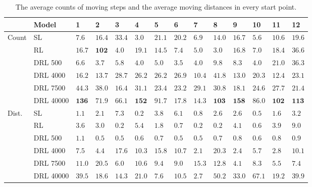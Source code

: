  \begin{table}[!ht]
   \centering
   \caption{The average counts of moving steps and the average moving distances in every start point.}
   \label{tab:table_heatmapscore}
   \begin{tabular}{llp{0.5cm}p{0.5cm}p{0.5cm}p{0.5cm}p{0.5cm}p{0.5cm}p{0.5cm}p{0.5cm}p{0.5cm}p{0.5cm}p{0.5cm}p{0.5cm}}
   \hline
   &Model  & 1 & 2 & 3 & 4 & 5 & 6 & 7 & 8 & 9 & 10 & 11 & 12 \\
   \hline
   \multirow{6}{*}{Count} & SL &$ 7.6 $ &$ 16.4 $ &$ 33.4 $ &$ 3.0 $ &$ 21.1 $ &$ 20.2 $ &$ 6.9 $ &$ 14.0 $ &$ 16.7 $ &$ 5.6 $ &$ 10.6 $ &$ 19.6 $\\
   & RL  &$ 16.7 $ &$ \mathbf{102} $ &$ 4.0 $ &$ 19.1 $ &$ 14.5 $ &$ 7.4 $ &$ 5.0 $ &$ 3.0 $ &$ 16.8 $ &$ 7.0 $ &$ 18.4 $ &$ 36.6 $\\
   & DRL 500 &$ 6.6 $ &$ 3.7 $ &$ 5.8 $ &$ 4.0 $ &$ 5.0 $ &$ 3.5 $ &$ 4.0 $ &$ 9.8 $ &$ 8.3 $ &$ 4.0 $ &$ 21.0 $ &$ 36.3 $\\
   & DRL 4000 &$ 16.2 $ &$ 13.7 $ &$ 28.7 $ &$ 26.2 $ &$ 26.2 $ &$ \mathbf{26.9} $ &$ 10.4 $ &$ 41.8 $ &$ 13.0 $ &$ 20.3 $ &$ 12.4 $ &$ 23.1 $\\
   & DRL 7500 &$ 44.3 $ &$ 38.0 $ &$ 16.4 $ &$ 31.1 $ &$ 23.4 $ &$ 23.2 $ &$ \mathbf{29.1} $ &$ 30.8 $ &$ 18.1 $ &$ 24.6 $ &$ 27.7 $ &$ 21.4 $ \\
   & DRL 40000 &$ \mathbf{136} $ &$ 71.9 $ & $ \mathbf{66.1} $ & $ \mathbf{152} $ &$ \mathbf{91.7} $ &$ 17.8 $ &  $14.3 $ &$ \mathbf{103} $ &$ \mathbf{158} $ &$ \mathbf{86.0} $ &$ \mathbf{102} $ &$ \mathbf{113} $\\
   \hline
   \multirow{6}{*}{Dist.} & SL &$ 1.1 $ &$ 2.1 $ &$ 7.3 $ &$ 0.2 $ &$ 3.8 $ &$ 6.1 $ &$ 0.8 $ &$ 2.6 $ &$ 2.6 $ &$ 0.5 $ &$ 1.6 $ &$ 3.2 $ \\
   & RL &$ 3.6 $ &$ 3.0 $ &$ 0.2 $ &$ 5.4 $ &$ 1.8 $ &$ 0.7 $ &$ 0.2 $ &$ 0.2 $ &$ 4.1 $ &$ 0.6 $ &$ 3.9 $ &$ 9.0 $\\
   & DRL 500 &$ 1.1 $ &$ 0.5 $ &$ 0.5 $ &$ 0.6 $ &$ 0.7 $ &$ 0.5 $ &$ 0.5 $ &$ 0.7 $ &$ 0.8 $ &$ 0.6 $ &$ 0.8 $ &$ 0.9 $\\
   & DRL 4000 &$ 7.5 $ &$ 4.4 $ &$ \mathbf{17.6} $ &$ 10.3 $ &$ \mathbf{15.8} $ &$ \mathbf{10.7} $ &$ 2.1 $ &$ 20.3 $ &$ 2.4 $ &$ 5.7 $ &$ 2.8 $ &$ 10.1 $\\
   & DRL 7500 &$ 11.0 $ &$ \mathbf{20.5} $ &$ 6.0 $ &$ 10.6 $ &$ 9.4 $ &$ 9.0 $ &$ \mathbf{15.3} $ &$ 12.8 $ &$ 4.1 $ &$ 8.3 $ &$ 5.5 $ &$ 7.4 $\\
   & DRL 40000 &$ \mathbf{39.5} $ &$ 18.6 $ &$ 14.3 $ &$ \mathbf{21.0} $ &$ 7.6 $ &$ 10.5 $ &$ 2.7 $ &$ \mathbf{50.2} $ &$ \mathbf{33.0} $ &$ \mathbf{67.1} $ &$ \mathbf{19.2} $ &$ \mathbf{39.9} $\\
   \hline
   \end{tabular}
\end{table}
